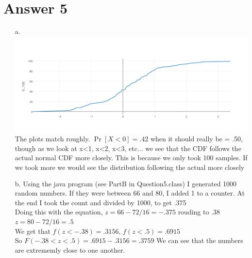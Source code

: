 \documentclass[11pt]{article}
\theoremstyle{definition}
\begin{document}
\section*{Answer 5}
\begin{enumerate}
	\item[a.] \includegraphics*[scale=0.5]{q5a.png}\\
	The plots match roughly.  $\Pr[X < 0] = .42$ when it should really be = .50, though as we look at x<1, x<2, x<3, etc... we see that the CDF follows the actual normal CDF more closely.
	This is because we only took 100 samples.  If we took more we would see the distribution following the actual more closely
	
	\item[b.] Using the java program (see PartB in Question5.class) I generated 1000 random numbers.  If they were between 66 and 80, I added 1 to a counter.  At the end I took the count and 
	divided by 1000, to get .375\\
	Doing this with the equation, $z = 66 - 72 / 16 = -.375$ rouding to .38\\
	$z = 80 - 72 / 16 = .5$\\
	We get that $f(z < -.38) = .3156$, $f(z < .5) = .6915$\\
	So $F(-.38 < z < .5) = .6915 - .3156 = .3759$
	\newline
	We can see that the numbers are extrememly close to one another.
\end{enumerate}
\end{document}
